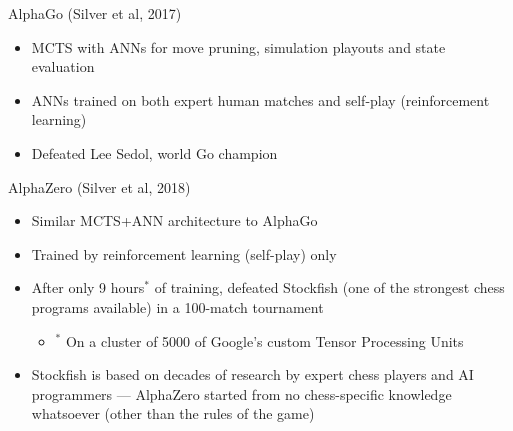 \begin{frame}{AlphaGo (Silver et al, 2017)}
	\begin{itemize}
		\pause\item MCTS with ANNs for move pruning, simulation playouts and state evaluation
		\pause\item ANNs trained on both expert human matches and self-play (reinforcement learning)
		\pause\item Defeated Lee Sedol, world Go champion
	\end{itemize}
\end{frame}

\begin{frame}{AlphaZero (Silver et al, 2018)}
	\begin{itemize}
		\pause\item Similar MCTS+ANN architecture to AlphaGo
		\pause\item Trained by reinforcement learning (self-play) only
		\pause\item After only 9 hours$^*$ of training, defeated Stockfish
			(one of the strongest chess programs available) in a 100-match tournament
			\begin{itemize}
				\pause\item $^*$ On a cluster of 5000 of Google's custom Tensor Processing Units
			\end{itemize}
		\pause\item Stockfish is based on decades of research by expert chess players and AI programmers
			--- AlphaZero started from no chess-specific knowledge whatsoever (other than the rules of the game)
	\end{itemize}
\end{frame}
